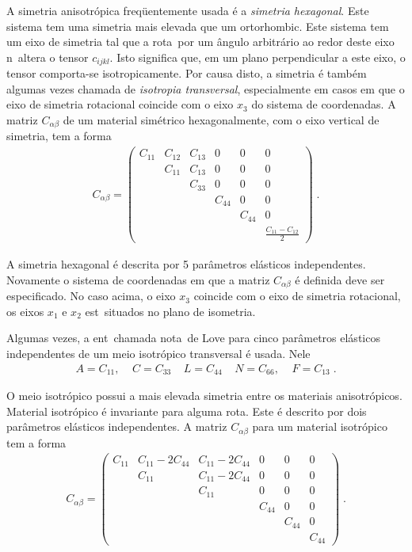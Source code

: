 A simetria anisotr\'opica freq\"uentemente usada \'e a
{\it simetria hexagonal}. Este sistema tem uma simetria
mais elevada que um ortorhombic. Este sistema tem um eixo
de simetria tal que a rota\cao\ por um \^angulo
arbitr\'ario ao redor deste eixo n\ao\ altera o tensor
$c_{ijkl}$. Isto significa que, em um plano perpendicular
a este eixo, o tensor comporta-se isotropicamente. Por
causa disto, a simetria \'e tamb\'em algumas vezes
chamada de {\it isotropia transversal}, especialmente em
casos em que o eixo de simetria rotacional coincide com o
eixo $x_3$ do sistema de coordenadas. A matriz
$C_{\alpha \beta}$ de um material sim\'etrico
hexagonalmente, com o eixo vertical de simetria, tem a
forma
\begin{eqnarray}
C_{\alpha \beta} = \left(
\begin{array}{cccccc}
C_{11} & C_{12} & C_{13} & 0      & 0      & 0 \\
       & C_{11} & C_{13} & 0      & 0      & 0 \\
       &        & C_{33} & 0      & 0      & 0 \\
       &        &        & C_{44} & 0      & 0 \\
       &        &        &        & C_{44} & 0 \\
       &        &        & & & \frac{C_{11}-C_{12}}{2}
\end{array} \right) \; .
\end{eqnarray}

A simetria hexagonal \'e descrita por 5 par\^ametros
el\'asticos independentes. Novamente o sistema de
coordenadas em que a matriz $C_{\alpha \beta}$ \'e
definida deve ser especificado. No caso acima, o eixo
$x_3$ coincide com o eixo de simetria rotacional, os
eixos $x_1$ e $x_2$ est\ao\ situados no plano de
isometria.

Algumas vezes, a ent\ao\ chamada nota\cao\ de Love para
cinco par\^ametros el\'asticos independentes de um meio
isotr\'opico transversal \'e usada. Nele
\begin{eqnarray}
A=C_{11}, \;\;\;\; C=C_{33} \;\;\;\; L=C_{44} \;\;\;\;
N=C_{66}, \;\;\;\; F=C_{13} \; .
\end{eqnarray}

O meio isotr\'opico possui a mais elevada simetria entre
os materiais anisotr\'opicos. Material isotr\'opico \'e
invariante para alguma rota\cao. Este \'e descrito por
dois par\^ametros el\'asticos independentes. A matriz
$C_{\alpha \beta}$ para um material isotr\'opico tem a
forma
\begin{eqnarray}
C_{\alpha \beta} = \left(
\begin{array}{cccccc}
C_{11} & C_{11}-2C_{44} & C_{11}-2C_{44} & 0 & 0 & 0 \\
       & C_{11} & C_{11}-2C_{44} & 0 & 0 & 0 \\
       &        & C_{11} & 0 & 0 & 0 \\
       &        &        & C_{44} & 0      & 0 \\
       &        &        &        & C_{44} & 0 \\
       &        &        &  &  & C_{44}
\end{array} \right) \; .
\end{eqnarray}

